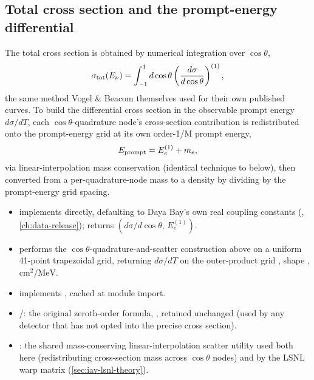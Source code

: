 \begin{theorybox}
\subsection*{Total cross section and the prompt-energy differential}
The total cross section is obtained by numerical integration over
$\cos\theta$,
\begin{equation}
  \sigma_{\rm tot}(E_\nu) = \int_{-1}^{1} d\cos\theta \left(\frac{d\sigma}{d\cos\theta}\right)^{(1)},
\end{equation}
the same method Vogel \& Beacom themselves used for their own published
curves. To build the differential cross section in the observable prompt
energy $d\sigma/dT$, each $\cos\theta$-quadrature node's cross-section
contribution is redistributed onto the prompt-energy grid at its own
order-1/M prompt energy,
\begin{equation}
  E_{\rm prompt} = E_e^{(1)} + m_e,
\end{equation}
via linear-interpolation mass conservation (identical technique to
 below), then converted from a
per-quadrature-node mass to a density by dividing by the prompt-energy grid
spacing.
\end{theorybox}

\begin{implbox}
\begin{itemize}
  \item {} implements
    directly, defaulting to Daya Bay's own real coupling constants
    (, \cref{ch:data-release}); returns
    $(d\sigma/d\cos\theta,\,E_e^{(1)})$.
  \item {} performs the $\cos\theta$-quadrature-and-scatter
    construction above on a uniform 41-point trapezoidal grid, returning
    $d\sigma/dT$ on the outer-product grid
    , shape ,
    $\mathrm{cm^2/MeV}$.
  \item {} implements
    , cached at module import.
  \item {}/:
    the original zeroth-order formula, ,
    retained unchanged (used by any detector that has not opted into the
    precise cross section).
  \item {}: the shared mass-conserving linear-interpolation
    scatter utility used both here (redistributing cross-section mass
    across $\cos\theta$ nodes) and by the LSNL warp matrix
    (\cref{sec:iav-lsnl-theory}).
\end{itemize}
\end{implbox}

